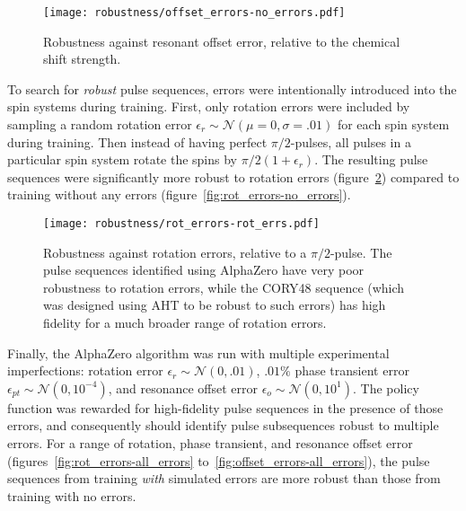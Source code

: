 \begin{figure}[H]
    \centering
    \texttt{[image: robustness/offset\_errors-no\_errors.pdf]}
    \caption{Robustness against resonant offset error, relative to the chemical shift strength.
    }
    \label{fig:offset_errors-no_errors}
\end{figure}



To search for \emph{robust} pulse sequences, errors were intentionally introduced into the spin systems during training. First, only rotation errors were included by sampling a random rotation error $\epsilon_r \sim \mathcal{N}(\mu=0, \sigma=.01)$ for each spin system during training. Then instead of having perfect $\pi/2$-pulses, all pulses in a particular spin system rotate the spins by $\pi/2(1+\epsilon_r)$. The resulting pulse sequences were significantly more robust to rotation errors (figure~\ref{fig:rot_errors-rot_errors})
compared to training without any errors (figure~\ref{fig:rot_errors-no_errors}).

\begin{figure}[H]
    \centering
    \texttt{[image: robustness/rot\_errors-rot\_errs.pdf]}
    \caption{Robustness against rotation errors, relative to a $\pi/2$-pulse. The pulse sequences identified using AlphaZero have very poor robustness to rotation errors, while the CORY48 sequence (which was designed using AHT to be robust to such errors) has high fidelity for a much broader range of rotation errors.
    }
    \label{fig:rot_errors-rot_errors}
\end{figure}


Finally, the AlphaZero algorithm was run with multiple experimental imperfections: rotation error $\epsilon_r \sim \mathcal{N}(0, .01)$, $.01\%$ phase transient error $\epsilon_{pt} \sim \mathcal{N}(0, 10^{-4})$, and resonance offset error $\epsilon_o \sim \mathcal{N}(0, 10^1)$.
The policy function was rewarded for high-fidelity pulse sequences in the presence of those errors, and consequently should identify pulse subsequences robust to multiple errors. For a range of rotation, phase transient, and resonance offset error (figures~\ref{fig:rot_errors-all_errors} to~\ref{fig:offset_errors-all_errors}), the pulse sequences from training \emph{with} simulated errors are more robust than those from training with no errors.


